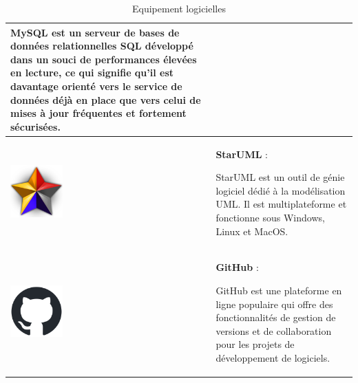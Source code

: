 \documentclass{article}
\begin{document}
\begin{table}[h!]
\begin{tabular}{|m{2cm}|m{12cm}|}
                    MySQL est un serveur de bases de données relationnelles SQL développé dans un souci de performances élevées en lecture, ce qui signifie qu'il est davantage orienté vers le service de données déjà en place que vers celui de mises à jour fréquentes et fortement sécurisées. \\
                    \hline
                    \includegraphics[width=2cm]{assets/logos/staruml-icon.png} &
                    \textbf{StarUML} :
                    
                    StarUML est un outil de génie logiciel dédié à la modélisation UML. Il est multiplateforme et fonctionne sous Windows, Linux et MacOS. \\
                    \hline
                    \includegraphics[width=2cm]{assets/logos/github-mark.png} &
                    \textbf{GitHub} :
                    
                    GitHub est une plateforme en ligne populaire qui offre des fonctionnalités de gestion de versions et de collaboration pour les projets de développement de logiciels. \\
                    \hline
                \end{tabular}
                \caption{Equipement logicielles}
            \end{table}
            \FloatBarrier
\end{document}
